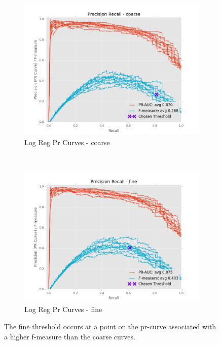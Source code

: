 \documentclass[ms]{nuthesis}
\begin{document}
\FloatBarrier
\begin{figure}[!htb]
    \centering
    \begin{subfigure}[t]{0.5\textwidth}
        \centering
        \includegraphics[width=\textwidth]{fig/LogReg_FindThreshold_PrCurve_coarse}
        \caption{Log Reg Pr Curves - coarse}
    \end{subfigure}%
    ~
    \begin{subfigure}[t]{0.5\textwidth}
        \centering
        \includegraphics[width=\textwidth]{fig/LogReg_FindThreshold_PrCurve_fine}
        \caption{Log Reg Pr Curves - fine}
    \end{subfigure}
    \caption{The fine threshold occurs at a point on the pr-curve associated with a higher
    f-measure than the coarse curves.}
\end{figure}
\FloatBarrier
\end{document}

